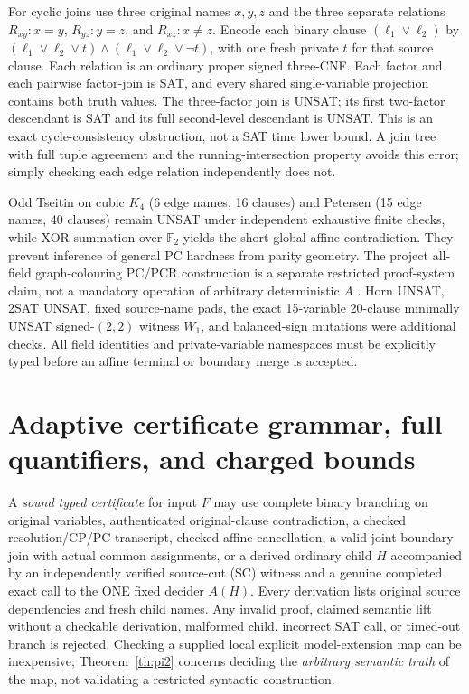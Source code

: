 \documentclass[11pt]{article}
\begin{document}
For cyclic joins use three original names $x,y,z$ and the three separate relations $R_{xy}:x=y$, $R_{yz}:y=z$, and $R_{xz}:x\ne z$. Encode each binary clause $(\ell_1\vee\ell_2)$ by
$ (\ell_1\vee\ell_2\vee t)\land(\ell_1\vee\ell_2\vee\neg t)$,
with one fresh private $t$ for that source clause. Each relation is an ordinary proper signed three-CNF. Each factor and each pairwise factor-join is SAT, and every shared single-variable projection contains both truth values. The three-factor join is UNSAT; its first two-factor descendant is SAT and its full second-level descendant is UNSAT. This is an exact cycle-consistency obstruction, not a SAT time lower bound. A join tree with full tuple agreement and the running-intersection property avoids this error; simply checking each edge relation independently does not.

Odd Tseitin on cubic $K_4$ (6 edge names, 16 clauses) and Petersen (15 edge names, 40 clauses) remain UNSAT under independent exhaustive finite checks, while XOR summation over $\mathbb F_2$ yields the short global affine contradiction. They prevent inference of general PC hardness from parity geometry. The project all-field graph-colouring PC/PCR construction is a separate restricted proof-system claim, not a mandatory operation of arbitrary deterministic $A$ \cite{PC22}. Horn UNSAT, 2SAT UNSAT, fixed source-name pads, the exact 15-variable 20-clause minimally UNSAT signed-$(2,2)$ witness $W_1$, and balanced-sign mutations were additional checks. All field identities and private-variable namespaces must be explicitly typed before an affine terminal or boundary merge is accepted.

\section{Adaptive certificate grammar, full quantifiers, and charged bounds}
A \emph{sound typed certificate} for input $F$ may use complete binary branching on original variables, authenticated original-clause contradiction, a checked resolution/CP/PC transcript, checked affine cancellation, a valid joint boundary join with actual common assignments, or a derived ordinary child $H$ accompanied by an independently verified source-cut (SC) witness and a genuine completed exact call to the ONE fixed decider $A(H)$. Every derivation lists original source dependencies and fresh child names. Any invalid proof, claimed semantic lift without a checkable derivation, malformed child, incorrect SAT call, or timed-out branch is rejected. Checking a supplied local explicit model-extension map can be inexpensive; Theorem~\ref{th:pi2} concerns deciding the \emph{arbitrary semantic truth} of the map, not validating a restricted syntactic construction.
\end{document}
